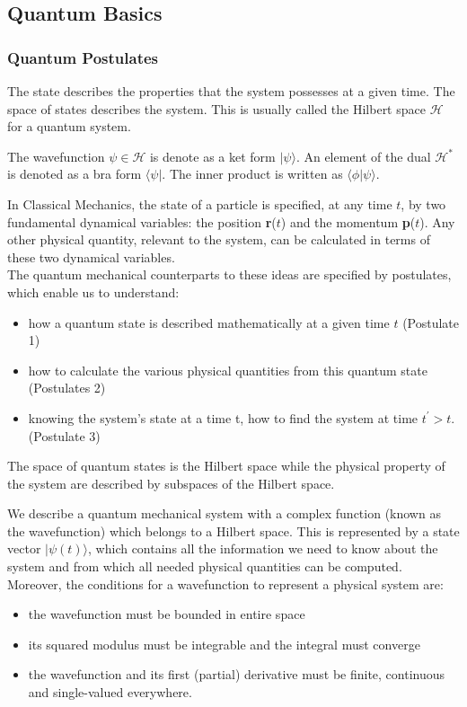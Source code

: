 \documentclass[a4paper]{article}
\begin{document}
\subsection{Quantum Basics}
\subsubsection*{Quantum Postulates \cite{zettili2009quantum}}
\begin{defi}
The state describes the properties that the system possesses at a given time. The space of states describes the system. This is usually called the Hilbert space $\mathcal{H}$ for a quantum system.
\end{defi}
\begin{defi}
The wavefunction $\psi\in\mathcal{H}$ is denote as a ket form $|\psi\rangle$. An element of the dual $\mathcal{H}^*$ is denoted as a bra form $\langle\psi|$. The inner product is written as $\langle\phi|\psi\rangle$.
\end{defi}
In Classical Mechanics, the state of a particle is specified, at any time $t$, by two fundamental dynamical variables: the position \textbf{r}($t$) and the momentum \textbf{p}($t$). Any other physical quantity, relevant to the system, can be calculated in terms of these two dynamical variables.\\[5pt]
The quantum mechanical counterparts to these ideas are specified by postulates, which enable us to understand:
\begin{itemize}
\item how a quantum state is described mathematically at a given time $t$ (Postulate 1)
\item how to calculate the various physical quantities from this quantum state (Postulates 2)
\item knowing the system's state at a time t, how to find the system at time $t^\prime>t$. (Postulate 3)
\end{itemize}
The space of quantum states is the Hilbert space while the physical property of the system are described by subspaces of the Hilbert space. 
\begin{Note}
We describe a quantum mechanical system with a complex function (known as the wavefunction) which belongs to a Hilbert space. This is represented by a state vector $|\psi(t)\big\rangle$, which contains all the information we need to know about the system and from which all needed physical quantities can be computed.\\[5pt]
Moreover, the conditions for a wavefunction to represent a physical system are:
\begin{itemize} 
\item the wavefunction must be bounded in entire space
\item its squared modulus must be integrable and the integral must converge \item the wavefunction and its first (partial) derivative must be finite, continuous and single-valued everywhere.
\end{itemize}
\end{Note}
\end{document}
